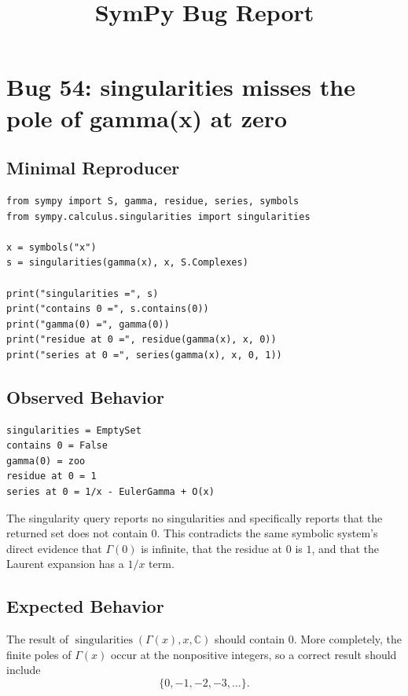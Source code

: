 \documentclass[11pt]{article}
\title{SymPy Bug Report}
\date{}
\begin{document}
\author{}
\maketitle

\section{Bug 54: singularities misses the pole of gamma(x) at zero}

\subsection{Minimal Reproducer}

\medskip

\begin{lstlisting}[style=bugpython]
from sympy import S, gamma, residue, series, symbols
from sympy.calculus.singularities import singularities

x = symbols("x")
s = singularities(gamma(x), x, S.Complexes)

print("singularities =", s)
print("contains 0 =", s.contains(0))
print("gamma(0) =", gamma(0))
print("residue at 0 =", residue(gamma(x), x, 0))
print("series at 0 =", series(gamma(x), x, 0, 1))
\end{lstlisting}

\subsection{Observed Behavior}

\medskip

\begin{lstlisting}[style=bugpython]
singularities = EmptySet
contains 0 = False
gamma(0) = zoo
residue at 0 = 1
series at 0 = 1/x - EulerGamma + O(x)
\end{lstlisting}

The singularity query reports no singularities and specifically reports that the returned set does not contain \(0\). This contradicts the same symbolic system's direct evidence that \(\Gamma(0)\) is infinite, that the residue at \(0\) is \(1\), and that the Laurent expansion has a \(1/x\) term.

\subsection{Expected Behavior}

The result of \(\operatorname{singularities}(\Gamma(x), x, \mathbb{C})\) should contain \(0\). More completely, the finite poles of \(\Gamma(x)\) occur at the nonpositive integers, so a correct result should include
\[
  \{0, -1, -2, -3, \ldots\}.
\]
\end{document}
